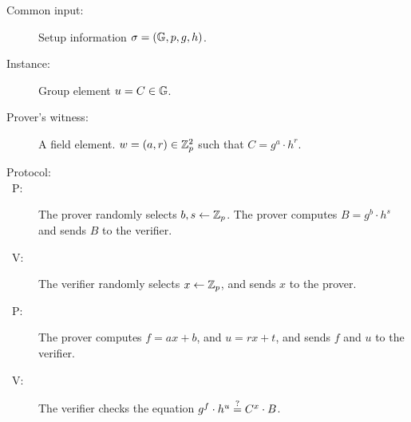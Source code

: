 \begin{description}\label{prot:schnorr}
\item[Common input:] Setup information $\mathsf{\sigma} = (\mathbb{G},p,g,h)$.
\item [Instance:] Group element $u = C \in \mathbb{G}$.
\item[Prover's witness:] A field element. $w = (a,r) \in \mathbb{Z}^2_p$ such that $C = g^a \cdot h^r$.
\item[Protocol:]
\item[\ P:] The prover randomly selects $b,s \gets \mathbb{Z}_p$. The prover computes $B = g^b \cdot h^s$ and sends $B$ to the verifier.

\item[\ V:] The verifier randomly selects $x\gets \mathbb{Z}_p$, and sends $x$ to the prover.

\item[\ P:] The prover computes $f = ax + b$, and $u = rx + t$, and sends $f$ and $u$ to the verifier.

\item[\ V:] The verifier checks the equation $g^f \cdot h^u \overset{?}{=} C^x \cdot B$.
\end{description}

